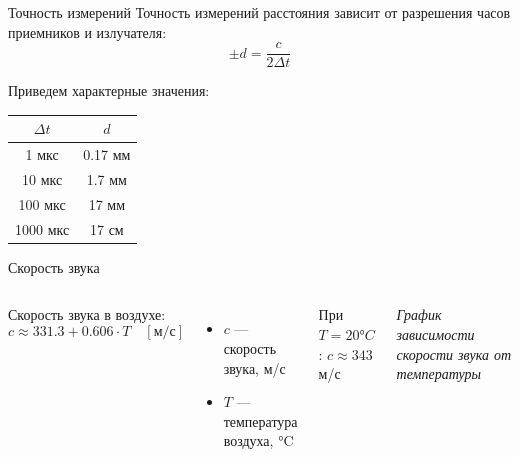 \documentclass[xcolor=table,10pt]{beamer}
\begin{document}
\begin{frame}{Точность измерений}
Точность измерений расстояния зависит от разрешения часов приемников и излучателя:
\begin{equation}
 \pm d = \frac{c}{2 \Delta t}
\end{equation}

Приведем характерные значения:

\begin{table}[h!]
    \centering
    \begin{tabular}{|c|c|}
        \hline
        $\Delta t$ & $d$ \\
        \hline
        1 мкс & 0.17 мм  \\
        10 мкс & 1.7 мм \\
        100 мкс & 17 мм \\
        1000 мкс & 17 см \\
        \hline
    \end{tabular}
    \label{tab:example}
\end{table}
\end{frame}

\begin{frame}{Скорость звука}
\begin{columns}
  \hspace*{1em}
  Скорость звука в воздухе:
  \begin{equation}
    c \approx 331.3 + 0.606 \cdot T\quad [\text{м/с}]
  \end{equation}
  
  \begin{itemize}
    \item $c$ — скорость звука, м/с
    \item $T$ — температура воздуха, °C
  \end{itemize}
  
  \vspace{0.5cm}
  При $T = 20°C$: $c \approx 343$ м/с
  
  \centering
  \vspace{1cm}
  \textit{График зависимости скорости звука от температуры}  
\end{columns}
\end{frame}
\end{document}
